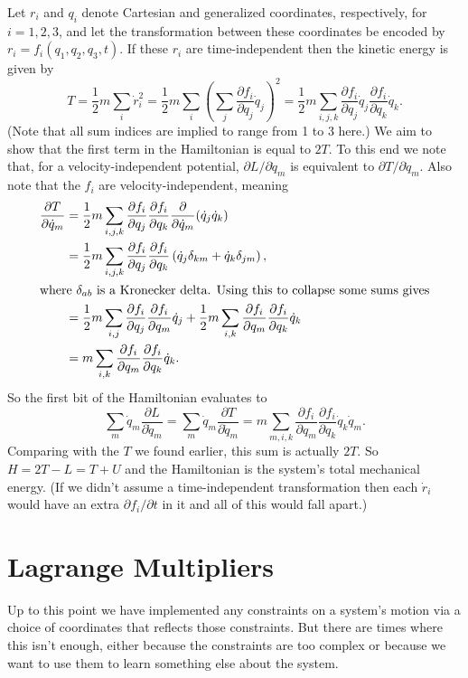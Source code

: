 \documentclass[../p111main.tex]{subfiles}
\begin{document}
Let $r_i$ and $q_i$ denote Cartesian and generalized coordinates, respectively, for $i = 1, 2, 3$, and let the transformation between these coordinates be encoded by $r_i = f_i(q_1, q_2, q_3, t)$.
If these $r_i$ are time-independent then the kinetic energy is given by
\[ T = \frac{1}{2} m \sum_{i}^{} \dot r_i^2 = \frac{1}{2} m \sum_{i}^{} \left( \sum_{j}^{} \frac{\partial f_i}{\partial q_j} \dot q_j \right)^2 = \frac{1}{2} m \sum_{i,j,k}^{} \frac{\partial f_i}{\partial q_j} \dot q_j \frac{\partial f_i}{\partial q_k} \dot q_k. \]
(Note that all sum indices are implied to range from 1 to 3 here.)
We aim to show that the first term in the Hamiltonian is equal to $2T$.
To this end we note that, for a velocity-independent potential, $\partial L / \partial \dot q_m$ is equivalent to $\partial T / \partial \dot q_m$.
Also note that the $f_i$ are velocity-independent, meaning
\begin{align*}
    \frac{\partial T}{\partial \dot q_m} &= \frac{1}{2} m \sum_{i,j,k} \frac{\partial f_i}{\partial q_j} \frac{\partial f_i}{\partial q_k} \frac{\partial}{\partial \dot q_m} (\dot q_j \dot q_k) \\
    &= \frac{1}{2} m \sum_{i,j,k} \frac{\partial f_i}{\partial q_j} \frac{\partial f_i}{\partial q_k} \left( \dot q_j \delta_{km} + \dot q_k \delta_{jm} \right), \\
    \intertext{where $\delta_{ab}$ is a Kronecker delta. Using this to collapse some sums gives}
    &= \frac{1}{2} m \sum_{i,j}^{} \frac{\partial f_i}{\partial q_j} \frac{\partial f_i}{\partial q_m} \dot q_j + \frac{1}{2} m \sum_{i,k}^{} \frac{\partial f_i}{\partial q_m} \frac{\partial f_i}{\partial q_k} \dot q_k \\
    &= m \sum_{i,k}^{} \frac{\partial f_i}{\partial q_m} \frac{\partial f_i}{\partial q_k} \dot q_k.
\end{align*}
So the first bit of the Hamiltonian evaluates to
\[ \sum_{m}^{} \dot q_m \frac{\partial L}{\partial \dot q_m} = \sum_{m}^{} \dot q_m \frac{\partial T}{\partial \dot q_m} = m \sum_{m,i,k}^{} \frac{\partial f_i}{\partial q_m} \frac{\partial f_i}{\partial q_k} \dot q_k \dot q_m. \]
Comparing with the $T$ we found earlier, this sum is actually $2T$.
So $H = 2T - L = T + U$ and the Hamiltonian is the system's total mechanical energy.
(If we didn't assume a time-independent transformation then each $\dot r_i$ would have an extra $\partial f_i / \partial t$ in it and all of this would fall apart.)

\section{Lagrange Multipliers}
Up to this point we have implemented any constraints on a system's motion via a choice of coordinates that reflects those constraints.
But there are times where this isn't enough, either because the constraints are too complex or because we want to use them to learn something else about the system.
\end{document}
